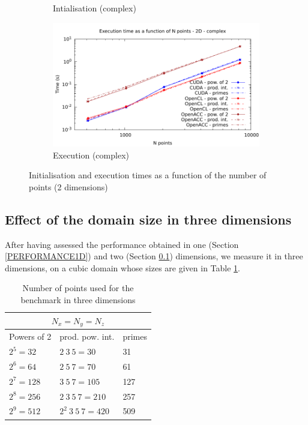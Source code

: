 \documentclass[12pt, a4paper]{article}
\begin{document}
\begin{figure}[H]
\begin{subfigure}{.5\textwidth}
\caption{Intialisation (complex)}
\label{FFT2DCI}
\end{subfigure}%
\begin{subfigure}{.5\textwidth}
\centering
\includegraphics[width=.9\linewidth]{graphs/fft-2d-c-exec.pdf}
\caption{Execution (complex)}
\label{FFT2DCE}
\end{subfigure}
\caption{Initialisation and execution times as a function of the number of points (2 dimensions)}
\label{FFT2D}
\end{figure}


\subsection{Effect of the domain size in three dimensions}\label{PERFORMANCE3D}
After having assessed the performance obtained in one (Section \ref{PERFORMANCE1D}) and two (Section \ref{PERFORMANCE3D}) dimensions, we measure it in three dimensions, on a cubic domain whose sizes are given in Table \ref{3DSIZES}.

\begin{table}[H]
  \centering
  \captionsetup{width=0.8\linewidth}
\begin{tabular}{|l|l|l|}
  \hline
  \multicolumn{3}{|c|}{$N_x=N_y=N_z$}\\
  \hline
  \hline
Powers of 2 & prod. pow. int. & primes\\ \hline
$2^5 = 32$ & $2\ 3\ 5 =	30$ & 31\\ \hline
$2^6 = 64$ & $2\ 5\ 7 = 70$ & 61\\ \hline
$2^7 = 128$ & $3\ 5\ 7 = 105$ & 127\\ \hline
$2^8 = 256$ & $2\ 3\ 5\ 7 = 210$ & 257\\ \hline
$2^9 = 512$ & $2^2\ 3\ 5\ 7 = 420$ & 509\\ \hline
\end{tabular}
\caption{Number of points used for the benchmark in three dimensions}\label{3DSIZES}
\end{table}
\end{document}
